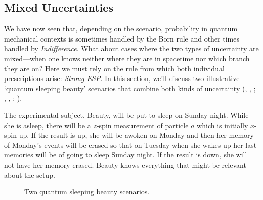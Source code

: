 \documentclass[onecolumn,secnumarabic,amsmath,amssymb,balancelastpage,nofootinbib]{article}
\begin{document}
\subsection{Mixed Uncertainties}\label{mixed}

We have now seen that, depending on the scenario, probability in quantum mechanical contexts is sometimes handled by the Born rule and other times handled by \emph{Indifference}.  What about cases where the two types of uncertainty are mixed---when one knows neither where they are in spacetime nor which branch they are on?  Here we must rely on the rule from which both individual prescriptions arise: \emph{Strong ESP}.  In this section, we'll discuss two illustrative `quantum sleeping beauty' scenarios that combine both kinds of uncertainty (\citeauthor{plewis}, \citeyear{plewis}, \citeyear{lewis2009reply}; \citeauthor{papineau2009}, \citeyear{papineau2009}, \citeyear{papineau2009reply}; \citealp{peterson,bradley2011,bradley2014,wilson2013,groisman2013}).

\begin{description}[font=\normalfont\scshape]
\item[Two-Branch-Beauty] The experimental subject, Beauty, will be put to sleep on Sunday night.  While she is asleep, there will be a $z$-spin measurement of particle $a$ which is initially $x$-spin up.  If the result is up, she will be awoken on Monday and then her memory of Monday's events will be erased so that on Tuesday when she wakes up her last memories will be of going to sleep Sunday night.  If the result is down, she will not have her memory erased.  Beauty knows everything that might be relevant about the setup.
\end{description}

\begin{figure}[htb]
\caption{Two quantum sleeping beauty scenarios.}
\label{}
\end{figure}
\end{document}
